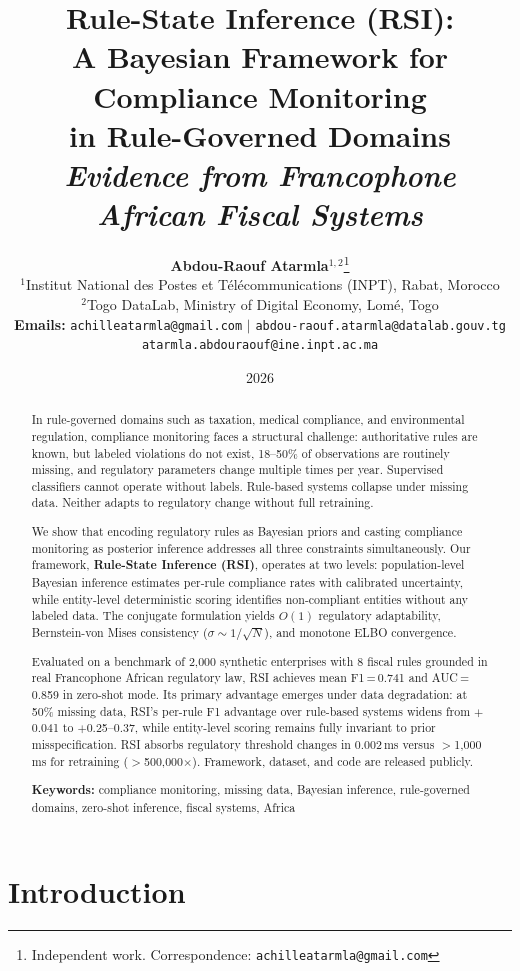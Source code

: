 \documentclass[letterpaper]{article}
\title{%
\textbf{Rule-State Inference (RSI):}\\
\textbf{A Bayesian Framework for Compliance Monitoring}\\
\textbf{in Rule-Governed Domains}\\[0.4em]
\large\textit{Evidence from Francophone African Fiscal Systems}
}
\author{
    \textbf{Abdou-Raouf Atarmla}$^{1,2}$\thanks{Independent work. Correspondence: \texttt{achilleatarmla@gmail.com}} \\
    \small $^{1}$Institut National des Postes et T\'el\'ecommunications (INPT), Rabat, Morocco \\
    \small $^{2}$Togo DataLab, Ministry of Digital Economy, Lom\'e, Togo \\
    \small \textbf{Emails:} \texttt{achilleatarmla@gmail.com} $|$ \texttt{abdou-raouf.atarmla@datalab.gouv.tg} \\
    \small \texttt{atarmla.abdouraouf@ine.inpt.ac.ma}
}
\date{2026}
\begin{document}
\maketitle
\thispagestyle{empty}

\begin{abstract}
\noindent
In rule-governed domains such as taxation, medical compliance, and
environmental regulation, compliance monitoring faces a structural
challenge: authoritative rules are known, but labeled violations do
not exist, 18--50\% of observations are routinely missing, and
regulatory parameters change multiple times per year. Supervised
classifiers cannot operate without labels. Rule-based systems collapse
under missing data. Neither adapts to regulatory change without full
retraining.

We show that encoding regulatory rules as Bayesian priors and casting
compliance monitoring as posterior inference addresses all three
constraints simultaneously. Our framework, \textbf{Rule-State
Inference (RSI)}, operates at two levels: population-level Bayesian
inference estimates per-rule compliance rates with calibrated
uncertainty, while entity-level deterministic scoring identifies
non-compliant entities without any labeled data. The conjugate
formulation yields $O(1)$ regulatory adaptability,
Bernstein-von Mises consistency ($\sigma \sim 1/\sqrt{N}$), and
monotone ELBO convergence.

Evaluated on a benchmark of 2{,}000 synthetic enterprises with 8
fiscal rules grounded in real Francophone African regulatory law, RSI
achieves mean F1\,=\,0.741 and AUC\,=\,0.859 in zero-shot mode.
Its primary advantage emerges under data degradation: at 50\% missing
data, RSI's per-rule F1 advantage over rule-based systems widens from
$+$0.041 to $+$0.25--0.37, while entity-level scoring remains fully
invariant to prior misspecification. RSI absorbs regulatory threshold
changes in 0.002\,ms versus $>$1{,}000\,ms for retraining
($>$500{,}000$\times$). Framework, dataset, and code are released
publicly.

\medskip
\noindent\textbf{Keywords:} compliance monitoring, missing data,
Bayesian inference, rule-governed domains, zero-shot inference,
fiscal systems, Africa
\end{abstract}

\newpage

\section{Introduction}
\label{sec:intro}
\end{document}
